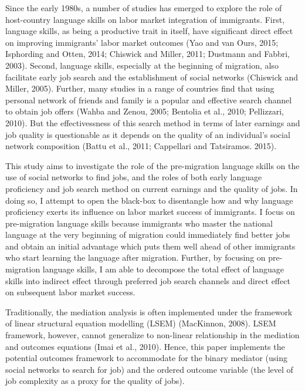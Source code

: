 \documentclass[12pt,a4paper]{article}
\begin{document}
Since the early 1980s, a number of studies has emerged to explore the role of host-country language skills on labor market integration of immigrants. First, language skills, as being a productive trait in itself, have significant direct effect on improving immigrants' labor market outcomes (Yao and van Ours, 2015; Isphording and Otten, 2014; Chiswick and Miller, 2011; Dustmann and Fabbri, 2003). Second, language skills, especially at the beginning of migration, also facilitate early job search and the establishment of social networks (Chiswick and Miller, 2005). Further, many studies in a range of countries find that using personal network of friends and family is a popular and effective search channel to obtain job offers (Wahba and Zenou, 2005; Bentolia et al., 2010; Pellizzari, 2010). But the effectivessness of this search method in terms of later earnings and job quality is questionable as it depends on the quality of an individual's social network composition (Battu et al., 2011; Cappellari and Tatsiramos. 2015).

This study aims to investigate the role of the pre-migration language skills on the use of social networks to find jobs, and the roles of both early language proficiency and job search method on current earnings and the quality of jobs. In doing so, I attempt to open the black-box to disentangle how and why language proficiency exerts its influence on labor market success of immigrants. I focus on pre-migration language skills because immigrants who master the national language at the very beginning of migration could immediately find better jobs and obtain an initial advantage which puts them well ahead of other immigrants who start learning the language after migration. Further, by focusing on pre-migration language skills, I am able to decompose the total effect of language skills into indirect effect through preferred job search channels and direct effect on subsequent labor market success.

Traditionally, the mediation analysis is often implemented under the framework of linear structural equation modelling (LSEM) (MacKinnon, 2008). LSEM framework, however, cannot generalize to non-linear relationship in the mediation and outcomes equations (Imai et al., 2010). Hence, this paper implements the potential outcomes framework to accommodate for the binary mediator (using social networks to search for job) and the ordered outcome variable (the level of job complexity as a proxy for the quality of jobs).
\end{document}
